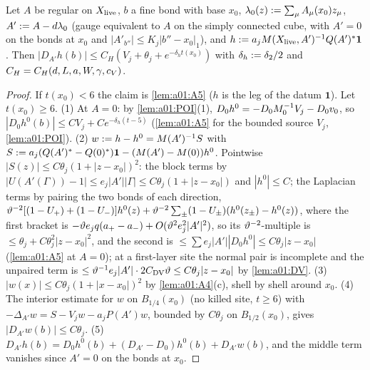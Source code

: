 \begin{lemma}\label{lem:a01:H}
Let $A$ be regular on $X_{\mathrm{live}}$, $b$ a fine bond with base $x_0$, $\lambda_0(z):=\sum_\mu A_\mu(x_0)z_\mu$, $A':= A-d\lambda_0$ (gauge equivalent to $A$ on the simply connected cube, with $A'=0$ on the bonds at $x_0$ and $|A'_{b''}|\le K_j|b''-x_0|_1$), and $h:= a_jM(X_{\mathrm{live}},A')^{-1}Q(A')^*\mathbf 1$. Then $|D_{A'}h(b)|\le C_H(V_j+\theta_j+e^{-\delta_ht(x_0)})$ with $\delta_h:=\delta_2/2$ and $C_H=C_H(d,L,a,W,\gamma,c_V)$.
\end{lemma}
\begin{proof}
If $t(x_0)<6$ the claim is \cref{lem:a01:A5} ($h$ is the leg of the datum $\mathbf 1$). Let $t(x_0)\ge6$. (1) At $A=0$: by \cref{lem:a01:POI}(1), $D_0h^0=-D_0M_0^{-1}V_j-D_0v_0$, so $|D_0h^0(b)|\le CV_j+Ce^{-\delta_h(t-5)}$ (\cref{lem:a01:A5} for the bounded source $V_j$, \cref{lem:a01:POI}). (2) $w:= h-h^0=M(A')^{-1}S$ with $S:= a_j(Q(A')^*-Q(0)^*)\mathbf 1-(M(A')-M(0))h^0$. Pointwise $|S(z)|\le C\theta_j(1+|z-x_0|)^2$: the block terms by $|U(A'(\Gamma))-1|\le e_j|A'||\Gamma|\le C\theta_j(1+|z-x_0|)$ and $|h^0|\le C$; the Laplacian terms by pairing the two bonds of each direction, $\vartheta^{-2}[(1-U_+)+(1-U_-)]h^0(z)+\vartheta^{-2}\sum_\pm(1-U_\pm)(h^0(z_\pm)-h^0(z))$, where the first bracket is $-\vartheta e_jq(a_+-a_-)+O(\vartheta^2e_j^2|A'|^2)$, so its $\vartheta^{-2}$-multiple is $\le\theta_j+C\theta_j^2|z-x_0|^2$, and the second is $\le\sum e_j|A'||D_0h^0|\le C\theta_j|z-x_0|$ (\cref{lem:a01:A5} at $A=0$); at a first-layer site the normal pair is incomplete and the unpaired term is $\le\vartheta^{-1}e_j|A'|\cdot2C_{\mathrm{DV}}\vartheta\le C\theta_j|z-x_0|$ by \cref{lem:a01:DV}. (3) $|w(x)|\le C\theta_j(1+|x-x_0|)^2$ by \cref{lem:a01:A4}(c), shell by shell around $x_0$. (4) The interior estimate for $w$ on $B_{1/4}(x_0)$ (no killed site, $t\ge6$) with $-\Delta_{A'}w=S-V_jw-a_jP(A')w$, bounded by $C\theta_j$ on $B_{1/2}(x_0)$, gives $|D_{A'}w(b)|\le C\theta_j$. (5) $D_{A'}h(b)=D_0h^0(b)+(D_{A'}-D_0)h^0(b)+D_{A'}w(b)$, and the middle term vanishes since $A'=0$ on the bonds at $x_0$.
\end{proof}

